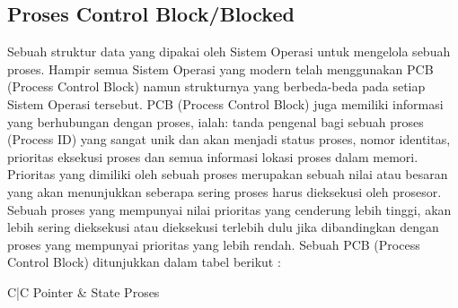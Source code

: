 	\subsection{Proses Control Block/Blocked}
	Sebuah struktur data yang dipakai oleh Sistem Operasi untuk mengelola sebuah proses. Hampir semua Sistem Operasi yang modern telah menggunakan PCB (Process Control Block) namun strukturnya yang berbeda-beda pada setiap Sistem Operasi tersebut. PCB (Process Control Block) juga memiliki informasi yang berhubungan dengan proses, ialah: tanda pengenal bagi sebuah proses (Process ID) yang sangat unik dan akan menjadi status proses, nomor identitas, prioritas eksekusi proses dan semua informasi lokasi proses dalam memori. Prioritas yang dimiliki oleh sebuah proses merupakan sebuah nilai atau besaran yang akan menunjukkan seberapa sering proses harus dieksekusi oleh prosesor. Sebuah proses yang mempunyai nilai prioritas yang cenderung lebih tinggi, akan lebih sering dieksekusi atau dieksekusi terlebih dulu jika dibandingkan dengan proses yang mempunyai prioritas yang lebih rendah.
	Sebuah PCB (Process Control Block) ditunjukkan dalam tabel berikut : 
	
	\begin{table}[H]
		\begin{tabular}{C|C}
			\hline
			Pointer & State Proses\\
			\hline
			\\
			\hline
			\\
			\hline
			\\
			\hline
			\\
			\hline
			\\
			\hline
			\\
		\end{tabular}
	\end{table}
	
